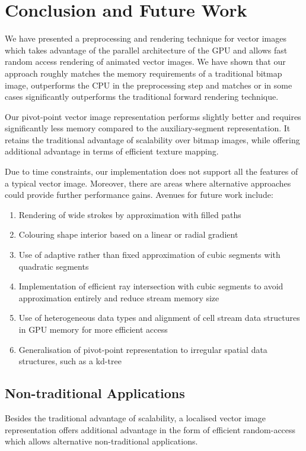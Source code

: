 \documentclass[11pt,a4paper,twoside]{article}
\begin{document}
\section {Conclusion and Future Work}

We have presented a preprocessing and rendering technique for vector images which takes advantage of the parallel architecture of the GPU and allows fast random access rendering of animated vector images. We have shown that our approach roughly matches the memory requirements of a traditional bitmap image, outperforms the CPU in the preprocessing step and matches or in some cases significantly outperforms the traditional forward rendering technique.

Our pivot-point vector image representation performs slightly better and requires significantly less memory compared to the auxiliary-segment representation. It retains the traditional advantage of scalability over bitmap images, while offering additional advantage in terms of efficient texture mapping.

Due to time constraints, our implementation does not support all the features of a typical vector image. Moreover, there are areas where alternative approaches could provide further performance gains. Avenues for future work include:

\begin {enumerate}
\item
Rendering of wide strokes by approximation with filled paths
\item
Colouring shape interior based on a linear or radial gradient
\item
Use of adaptive rather than fixed approximation of cubic segments with quadratic segments
\item
Implementation of efficient ray intersection with cubic segments to avoid approximation entirely and reduce stream memory size
\item
Use of heterogeneous data types and alignment of cell stream data structures in GPU memory for more efficient access
\item
Generalisation of pivot-point representation to irregular spatial data structures, such as a kd-tree
\end {enumerate}


\subsection {Non-traditional Applications}
Besides the traditional advantage of scalability, a localised vector image representation offers additional advantage in the form of efficient random-access which allows alternative non-traditional applications.
\end{document}
